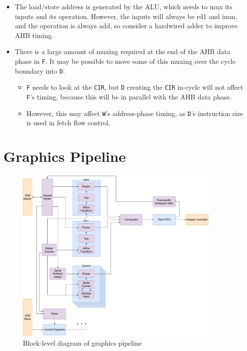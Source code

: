 \documentclass{article}
\begin{document}
\begin{itemize}
	\item The load/store address is generated by the ALU, which needs to mux its inputs and its operation. However, the inputs will always be rd1 and imm, and the operation is always add, so consider a hardwired adder to improve AHB timing.
	\item There is a large amount of muxing required at the end of the AHB data phase in \texttt{F}. It may be possible to move some of this muxing over the cycle boundary into \texttt{D}.
	\begin{itemize}
		\item \texttt{F} needs to look at the \texttt{CIR}, but \texttt{D} creating the \texttt{CIR} in-cycle will not affect \texttt{F}'s timing, because this will be in parallel with the AHB data phase.
		\item However, this may affect \texttt{W}'s address-phase timing, as \texttt{D}'s instruction size is used in fetch flow control.
	\end{itemize}
\end{itemize}

\section{Graphics Pipeline}

\begin{figure}[!htb]
\centering
\caption{Block-level diagram of graphics pipeline}
\includegraphics[width=0.9\textwidth]{diagrams/graphics.pdf}
\end{figure}
\end{document}
